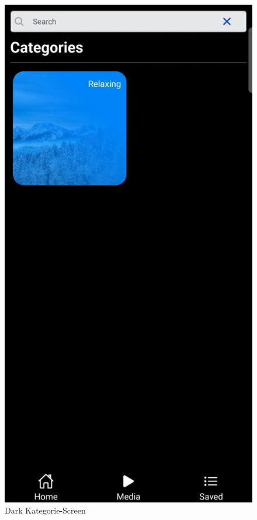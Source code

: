 \begin{figure}[H]
\begin{minipage}{0.5\textwidth}
    \end{minipage}
    \begin{minipage}{0.5\textwidth}
        \centering
        \includegraphics[height=2\textwidth]{./pics/dKategorie.jpg}
        \caption{Dark Kategorie-Screen}
    \end{minipage}
\end{figure}
